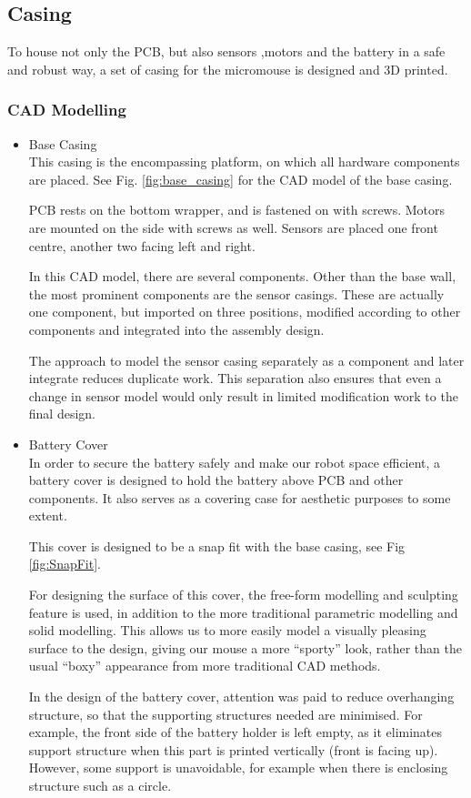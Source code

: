 \FloatBarrier
\vspace{1cm}

\subsection{Casing}

To house not only the PCB, but also sensors ,motors and the battery in a safe and robust way, a set of casing for the micromouse is designed and 3D printed.

\subsubsection{CAD Modelling}
\begin{itemize}
    \item Base Casing\\ 
    This casing is the encompassing platform, on which all hardware components are placed. See Fig. \ref{fig:base_casing} for the CAD model of the base casing.

    PCB rests on the bottom wrapper, and is fastened on with screws. Motors are mounted on the side with screws as well. Sensors are placed one front centre, another two facing left and right.

    In this CAD model, there are several components. Other than the base wall, the most prominent components are the sensor casings. These are actually one component, but imported on three positions, modified according to other components and integrated into the assembly design. 

    The approach to model the sensor casing separately as a component and later integrate reduces duplicate work. This separation also ensures that even a change in sensor model would only result in limited modification work to the final design.
    

    \item Battery Cover\\ 
    In order to secure the battery safely and make our robot space efficient, a battery cover is designed to hold the battery above PCB and other components. It also serves as a covering case for aesthetic purposes to some extent.

    This cover is designed to be a snap fit with the base casing, see Fig \ref{fig:SnapFit}.

    For designing the surface of this cover, the free-form modelling and sculpting feature is used, in addition to the more traditional parametric modelling and solid modelling. This allows us to more easily model a visually pleasing surface to the design, giving our mouse a more “sporty” look, rather than the usual “boxy” appearance from more traditional CAD methods.

    In the design of the battery cover, attention was paid to reduce overhanging structure, so that the supporting structures needed are minimised. For example, the front side of the battery holder is left empty, as it eliminates support structure when this part is printed vertically (front is facing up). However, some support is unavoidable, for example when there is enclosing structure such as a circle.

\end{itemize}


